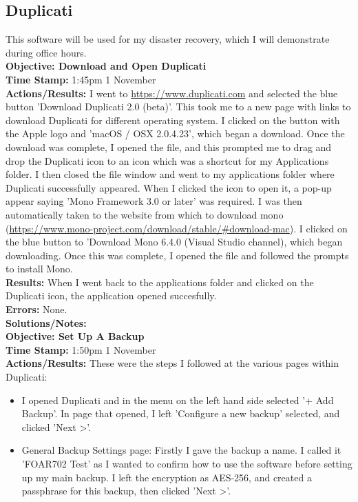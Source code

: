 \documentclass{article}
\begin{document}
\begin{FlushLeft}
\subsection{Duplicati}
This software will be used for my disaster recovery, which I will demonstrate during office hours.\\
\textbf{Objective: Download and Open Duplicati}\\
\textbf{Time Stamp:} 1:45pm 1 November\\
\textbf{Actions/Results:} I went to \url{https://www.duplicati.com} and selected the blue button 'Download Duplicati 2.0 (beta)'. This took me to a new page with links to download Duplicati for different operating system. I clicked on the button with the Apple logo and 'macOS / OSX 2.0.4.23', which began a download. Once the download was complete, I opened the file, and this prompted me to drag and drop the Duplicati icon to an icon which was a shortcut for my Applications folder. I then closed the file window and went to my applications folder where Duplicati successfully appeared. When I clicked the icon to open it, a pop-up appear saying 'Mono Framework 3.0 or later' was required. I was then automatically taken to the website from which to download mono (\url{https://www.mono-project.com/download/stable/#download-mac}). I clicked on the blue button to 'Download Mono 6.4.0 (Visual Studio channel), which began downloading. Once this was complete, I opened the file and followed the prompts to install Mono.\\
\textbf{Results:} When I went back to the applications folder and clicked on the Duplicati icon, the application opened succesfully.\\
\textbf{Errors:} None.\\
\textbf{Solutions/Notes:}\\
\vspace{5mm}
\textbf{Objective: Set Up A Backup}\\
\textbf{Time Stamp:} 1:50pm 1 November\\
\textbf{Actions/Results:} These were the steps I followed at the various pages within Duplicati:
\begin{itemize}
    \item I opened Duplicati and in the menu on the left hand side selected '+ Add Backup'. In page that opened, I left 'Configure a new backup' selected, and clicked 'Next \textgreater'.
    \item General Backup Settings page: Firstly I gave the backup a name. I called it 'FOAR702 Test' as I wanted to confirm how to use the software before setting up my main backup. I left the encryption as AES-256, and created a passphrase for this backup, then clicked 'Next \textgreater'.

\end{itemize}
\end{FlushLeft}
\end{document}
